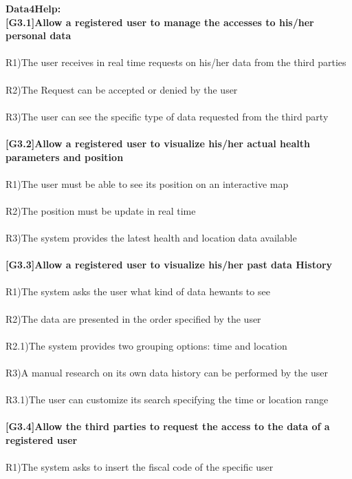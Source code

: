 \textbf{Data4Help:} \\
\textbf{[G3.1]Allow a registered user to manage the accesses to his/her personal data} \\ \\
R1)The user receives in real time requests on his/her data from the third parties \\ \\
R2)The Request can be accepted or denied by the user\\ \\
R3)The user can see the specific type of data requested from the third party \\ \\ 
\textbf{ [G3.2]Allow a registered user to visualize his/her actual health parameters and position} \\ \\
R1)The user must be able to see its position on an interactive map \\ \\
R2)The position must be update in real time \\ \\
R3)The system provides the latest health and location data available \\ \\
\textbf{[G3.3]Allow a registered user to visualize his/her past data History} \\ \\
R1)The system asks the user what kind of data he\she wants to see \\ \\
R2)The data are presented in the order specified by the user  \\ \\
R2.1)The system provides two grouping options: time and location \\ \\
R3)A manual research on its own data history can be performed by the user \\ \\
R3.1)The user can customize its search specifying the time or location range \\ \\ 
\textbf{[G3.4]Allow the third parties to request the access to the data of a registered user} \\ \\
R1)The system asks to insert the fiscal code of the specific user \\ \\
